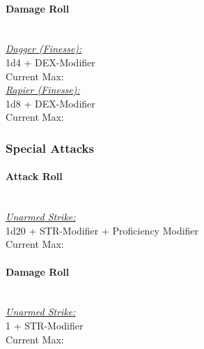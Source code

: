 \documentclass[letterpaper,openany,oneside,twocolumn]{book}
\newcommand{\PATH}{../../}
\begin{document}
\paragraph*{Damage Roll}\hfill\\
\underline{\textit{Dagger (Finesse):}}\\
1d4 + DEX-Modifier\\
\indent Current Max: 
\\
\underline{\textit{Rapier (Finesse):}}\\
1d8 + DEX-Modifier\\
\indent Current Max: 
\subsubsection*{Special Attacks}
\paragraph*{Attack Roll}\hfill\\
\underline{\textit{Unarmed Strike:}}\\
1d20 + STR-Modifier + Proficiency Modifier\\
\indent Current Max: 
\paragraph*{Damage Roll}\hfill\\
\underline{\textit{Unarmed Strike:}}\\
1 + STR-Modifier\\
\indent Current Max: 





\newcommand{\chord}[1]{\colorbox{gray!60}{\footnotesize{#1}}}
\clearpage
{}
\end{document}

